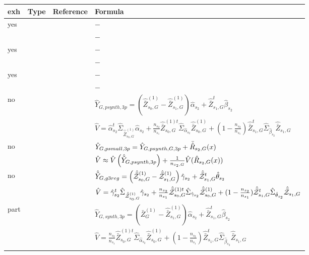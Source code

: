 \begin{table}
    \centering
\begin{tabular}{ l l r l}
	 exh 	&  Type	&  Reference & Formula\\ \toprule
     yes & \psynthetic{} & & $-$\\
 &  &  & $-$ \\
\lightrule
yes & \psmall{} &  & $-$\\
 &  &  & $-$\\
\lightrule
yes & \pextended{} &  & $-$\\
 &  &  & $-$\\
\strongrule

no 	&  \psynthetic{} 	& \cite[eq. 26b]{hill2017} & $\hat{Y}_{G,psynth,3p} = \left( \hat{\bar{Z}}_{s_0,G}^{(1)}- \hat{\bar{Z}}_{s_1,G}^{(1)}\right) \hat{\alpha}_{s_2} + \hat{\bar{Z}}^t_{s_1,G}\hat{\beta}_{s_2}$\\
        &    	&    \cite[eq. 26d]{hill2017} & $\hat{V} = \hat{\alpha}_{s_2}^t \hat{\Sigma}_{\hat{\bar{Z}}_{s_0,G}^{(1)}} \hat{\alpha}_{s_2} + \frac{n_{s_2}}{n_{s_1}} \hat{\bar{Z}}^{(1)t}_{s_0,G} \hat{\Sigma}_{ \hat{\alpha}_{s_2}} \hat{\bar{Z}}^{(1)}_{s_0,G} + (1-\frac{n_{s_2}}{n_{s_1}})\hat{\bar{Z}}^{t}_{s_1,G} \hat{\Sigma}_{ \hat{\beta}_{s_2}} \hat{\bar{Z}}_{s_1,G} $\\
\lightrule
			
no 	&  \psmall{} 	& \cite[eq. 22b]{hill2017} & $\hat{Y}_{G,psmall,3p} = \hat{Y}_{G,psynth,G,3p} + \bar{\hat{R}}_{s_2,G}(x)$\\
          &       & \cite[eq. 23b]{hill2017} & $\hat{V} \approx \hat{V}\left(\hat{\tilde{Y}}_{G,psynth,3p}\right) + \frac{1}{n_{s_2,G}}\hat{V}(\hat{R}_{s_2,G}(x))$ \\ 

\lightrule
no 	&  \pextended{} 	& \cite[eq. 23]{Man13c} & $\hat{\tilde{Y}}_{G,g3reg} = \left( \hat{\bar{\mathcal{Z}}}_{s_0,G}^{(1)}- \hat{\bar{\mathcal{Z}}}_{s_1,G}^{(1)}\right) \hat{\gamma}_{s_2} + \hat{\bar{\mathcal{Z}}}^t_{s_1,G}\hat{\theta}_{s_2}$\\
        &    	&     \cite[eq. 24]{Man13c} & $\hat{V} = \hat{\gamma}_{s_2}^t \hat{\Sigma}_{\hat{\bar{\mathcal{Z}}}_{s_0,G}^{(1)}} \hat{\gamma}_{s_2} + \frac{n_{s_2}}{n_{s_1}} \hat{\bar{\mathcal{Z}}}^{(1)t}_{s_0,G} \hat{\Sigma}_{ \hat{\gamma}_{s_2}} \hat{\bar{\mathcal{Z}}}^{(1)}_{s_0,G} + (1-\frac{n_{s_2}}{n_{s_1}})\hat{\bar{\mathcal{Z}}}^{t}_{s_1,G} \hat{\Sigma}_{ \hat{\theta}_{s_2}} \hat{\bar{\mathcal{Z}}}_{s_1,G} $\\
\strongrule
part 	&  \psynthetic{} 	& \cite[eq. 26a]{hill2017} & $\hat{Y}_{G,synth,3p} = \left( \bar{Z}_{G}^{(1)}- \hat{\bar{Z}}_{s_1,G}^{(1)}\right) \hat{\alpha}_{s_2} + \hat{\bar{Z}}^t_{s_1,G}\hat{\beta}_{s_2}$\\
        &    	&    \cite[eq. 26c]{hill2017} & $\hat{V} = \frac{n_{s_2}}{n_{s_1}} \hat{\bar{Z}}^{(1)t}_{s_0,G} \hat{\Sigma}_{ \hat{\alpha}_{s_2}} \hat{\bar{Z}}^{(1)}_{s_0,G} + (1-\frac{n_{s_2}}{n_{s_1}})\hat{\bar{Z}}^{t}_{s_1,G} \hat{\Sigma}_{ \hat{\beta}_{s_2}} \hat{\bar{Z}}_{s_1,G} $\\
\lightrule
			

\end{tabular}
\end{table}
